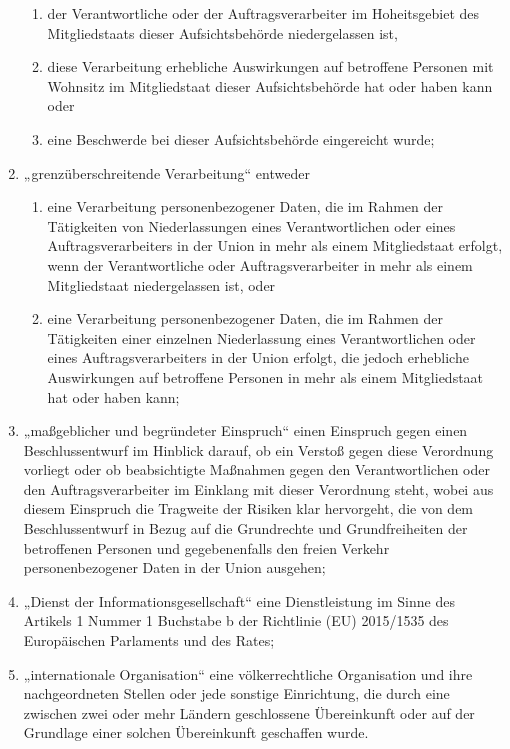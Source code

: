 \begin{enumerate}
  \begin{enumerate}

    \item der Verantwortliche oder der Auftragsverarbeiter im Hoheitsgebiet des Mitgliedstaats dieser Aufsichtsbehörde
     niedergelassen ist,

    \item diese Verarbeitung erhebliche Auswirkungen auf betroffene Personen mit Wohnsitz im Mitgliedstaat dieser
     Aufsichtsbehörde hat oder haben kann oder

    \item eine Beschwerde bei dieser Aufsichtsbehörde eingereicht wurde;

  \end{enumerate}

  \item „grenzüberschreitende Verarbeitung“ entweder

  \begin{enumerate}

    \item eine Verarbeitung personenbezogener Daten, die im Rahmen der Tätigkeiten von Niederlassungen eines
     Verantwortlichen oder eines Auftragsverarbeiters in der Union in mehr als einem Mitgliedstaat erfolgt, wenn der
     Verantwortliche oder Auftragsverarbeiter in mehr als einem Mitgliedstaat niedergelassen ist, oder

    \item eine Verarbeitung personenbezogener Daten, die im Rahmen der Tätigkeiten einer einzelnen Niederlassung eines
     Verantwortlichen oder eines Auftragsverarbeiters in der Union erfolgt, die jedoch erhebliche Auswirkungen auf
     betroffene Personen in mehr als einem Mitgliedstaat hat oder haben kann;

  \end{enumerate}


  \item „maßgeblicher und begründeter Einspruch“ einen Einspruch gegen einen Beschlussentwurf im Hinblick darauf, ob ein
   Verstoß gegen diese Verordnung vorliegt oder ob beabsichtigte Maßnahmen gegen den Verantwortlichen oder den
   Auftragsverarbeiter im Einklang mit dieser Verordnung steht, wobei aus diesem Einspruch die Tragweite der Risiken
   klar hervorgeht, die von dem Beschlussentwurf in Bezug auf die Grundrechte und Grundfreiheiten der betroffenen
   Personen und gegebenenfalls den freien Verkehr personenbezogener Daten in der Union ausgehen;

  \item „Dienst der Informationsgesellschaft“ eine Dienstleistung im Sinne des Artikels 1 Nummer 1 Buchstabe b der
   Richtlinie (EU) 2015/1535 des Europäischen Parlaments und des Rates;

  \item „internationale Organisation“ eine völkerrechtliche Organisation und ihre nachgeordneten Stellen oder jede
   sonstige Einrichtung, die durch eine zwischen zwei oder mehr Ländern geschlossene Übereinkunft oder auf der
   Grundlage einer solchen Übereinkunft geschaffen wurde.

\end{enumerate}

